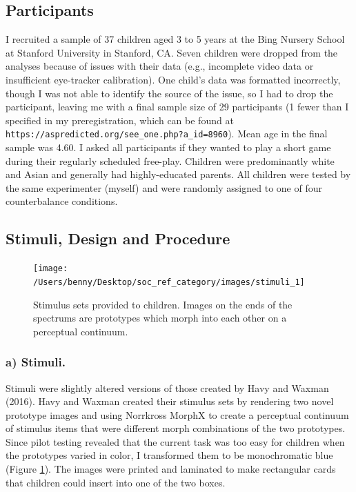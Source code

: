 \documentclass[,man,floatsintext]{apa6}
\begin{document}
\hypertarget{participants}{%
\subsection{Participants}\label{participants}}

I recruited a sample of 37 children aged 3 to 5 years at the Bing Nursery School at Stanford University in Stanford, CA. Seven children were dropped from the analyses because of issues with their data (e.g., incomplete video data or insufficient eye-tracker calibration). One child's data was formatted incorrectly, though I was not able to identify the source of the issue, so I had to drop the participant, leaving me with a final sample size of 29 participants (1 fewer than I specified in my preregistration, which can be found at \texttt{https://aspredicted.org/see\_one.php?a\_id=8960}). Mean age in the final sample was 4.60. I asked all participants if they wanted to play a short game during their regularly scheduled free-play. Children were predominantly white and Asian and generally had highly-educated parents. All children were tested by the same experimenter (myself) and were randomly assigned to one of four counterbalance conditions.

\hypertarget{stimuli-design-and-procedure}{%
\subsection{Stimuli, Design and Procedure}\label{stimuli-design-and-procedure}}

\begin{figure}

{\centering \texttt{[image: /Users/benny/Desktop/soc\_ref\_category/images/stimuli\_1]} 

}

\caption{Stimulus sets provided to children. Images on the ends of the spectrums are prototypes which morph into each other on a perceptual continuum.}\label{fig:stimuli}
\end{figure}

\hypertarget{a-stimuli.}{%
\subsubsection{a) Stimuli.}\label{a-stimuli.}}

Stimuli were slightly altered versions of those created by Havy and Waxman (2016). Havy and Waxman created their stimulus sets by rendering two novel prototype images and using Norrkross MorphX to create a perceptual continuum of stimulus items that were different morph combinations of the two prototypes. Since pilot testing revealed that the current task was too easy for children when the prototypes varied in color, I transformed them to be monochromatic blue (Figure \ref{fig:stimuli}). The images were printed and laminated to make rectangular cards that children could insert into one of the two boxes.
\end{document}
